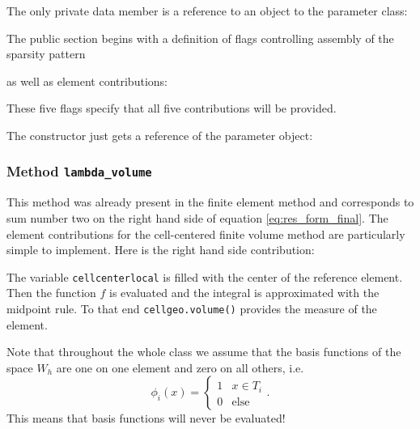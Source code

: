 \documentclass[a4paper,12pt]{article}
\begin{document}
The only private data member is a reference to an object
to the parameter class:


The public section begins with a definition of flags controlling
assembly of the sparsity pattern

as well as element contributions:

These five flags specify that all five contributions will be provided.

The constructor just gets a reference of the parameter object:


\subsubsection*{Method \lstinline{lambda_volume}}

This method was already present in the finite element method
and corresponds
to sum number two on the right hand side of equation \eqref{eq:res_form_final}.
The element contributions for the cell-centered finite volume method are
particularly simple to implement. Here is the right hand side contribution:

The variable \lstinline{cellcenterlocal} is filled with the
center of the reference element. Then the function $f$ is evaluated
and the integral is approximated with the midpoint rule.
To that end \lstinline{cellgeo.volume()} provides the measure
of the element.

Note that throughout the whole class we assume that the basis
functions of the space $W_h$ are one on one element and zero on
all others, i.e.
\begin{equation}
\phi_i(x) = \left\{ \begin{array}{ll} 1 & x\in T_i \\ 0 & \text{else} \end{array}
\right . .
\end{equation}
This means that basis functions will never be evaluated!
\end{document}
